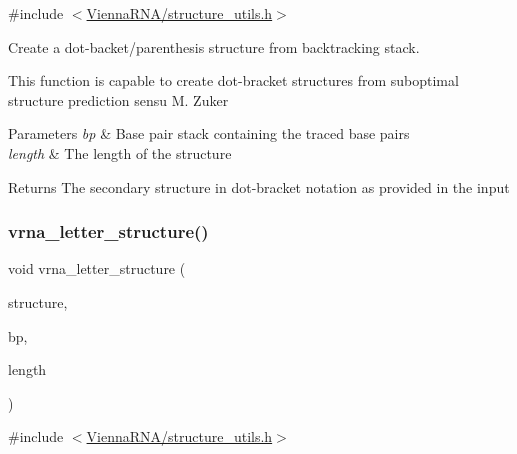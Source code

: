 {\ttfamily \#include $<$\mbox{\hyperlink{structure__utils_8h}{Vienna\+R\+N\+A/structure\+\_\+utils.\+h}}$>$}



Create a dot-\/backet/parenthesis structure from backtracking stack. 

This function is capable to create dot-\/bracket structures from suboptimal structure prediction sensu M. Zuker


\begin{DoxyParams}{Parameters}
{\em bp} & Base pair stack containing the traced base pairs \\
\hline
{\em length} & The length of the structure \\
\hline
\end{DoxyParams}
\begin{DoxyReturn}{Returns}
The secondary structure in dot-\/bracket notation as provided in the input 
\end{DoxyReturn}
\mbox{\label{group__struct__utils_ga6708519ddf10f1420016ad47b5a3baea}} 
\subsubsection{\texorpdfstring{vrna\+\_\+letter\+\_\+structure()}{vrna\_letter\_structure()}}
{\footnotesize\ttfamily void vrna\+\_\+letter\+\_\+structure (\begin{DoxyParamCaption}\item[{char $\ast$}]{structure,  }\item[{\mbox{\hyperlink{group__data__structures_gaa651bda42e7692f08cb603cd6834b0ee}{vrna\+\_\+bp\+\_\+stack\+\_\+t}} $\ast$}]{bp,  }\item[{unsigned int}]{length }\end{DoxyParamCaption})}



{\ttfamily \#include $<$\mbox{\hyperlink{structure__utils_8h}{Vienna\+R\+N\+A/structure\+\_\+utils.\+h}}$>$}

\mbox{\label{group__struct__utils_gaf002d69024d709744664a8b9ca3dd77d}} 
